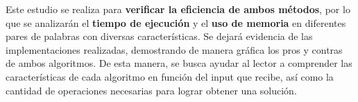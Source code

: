 Este estudio se realiza para \textbf{verificar la eficiencia de ambos métodos}, por lo que se analizarán el \textbf{tiempo de ejecución} y el \textbf{uso de memoria} en diferentes pares de palabras con diversas características. Se dejará evidencia de las implementaciones realizadas, demostrando de manera gráfica los pros y contras de ambos algoritmos. De esta manera, se busca ayudar al lector a comprender las características de cada algoritmo en función del input que recibe, así como la cantidad de operaciones necesarias para lograr obtener una solución.

